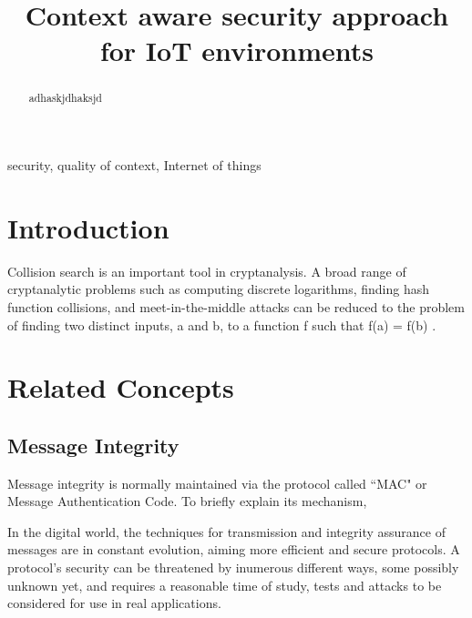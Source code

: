 \documentclass[letterpaper,conference]{IEEEtran}
\begin{document}
\title{Context aware security approach for IoT environments}
\author{
}

\maketitle

\begin{abstract}
adhaskjdhaksjd \cite{tanenbaum2002distributed}
\end{abstract}

\begin{IEEEkeywords}
security, quality of context, Internet of things
\end{IEEEkeywords}

\IEEEpeerreviewmaketitle

\section{Introduction}

Collision search is an important tool in cryptanalysis. A broad range of cryptanalytic problems
such as computing discrete logarithms, finding hash function collisions, and meet-in-the-middle
attacks can be reduced to the problem of finding two distinct inputs, a and b, to a function f such
that f(a) = f(b) \cite{van1999parallel}.

\section{Related Concepts} 

\subsection{Message Integrity}

Message integrity is normally maintained via the protocol called “MAC" or Message Authentication Code. 
To briefly explain its mechanism,

In the digital world, the techniques for transmission and integrity assurance of messages are in constant
evolution, aiming more efficient and secure protocols. A protocol's security can be threatened by inumerous
different ways, some possibly unknown yet, and requires a reasonable time of study, tests and attacks
to be considered for use in real applications.
\end{document}
